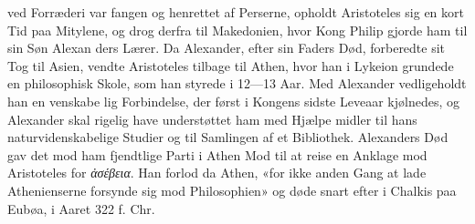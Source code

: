\documentclass[12pt,a4paper]{book}
\newcommand{\gk}[1]{\textit{#1}}
\begin{document}
ved Forræderi var fangen og henrettet af Perserne, opholdt
Aristoteles sig en kort Tid paa Mitylene, og drog derfra til
Makedonien, hvor Kong Philip gjorde ham til sin Søn Alexan\-%
ders Lærer. Da Alexander, efter sin Faders Død, forberedte
sit Tog til Asien, vendte Aristoteles tilbage til Athen, hvor
han i Lykeion grundede en philosophisk Skole, som han styrede
i 12---13 Aar. Med Alexander vedligeholdt han en venskabe\-%
lig Forbindelse, der først i Kongens sidste Leveaar kjølnedes,
og Alexander skal rigelig have understøttet ham med Hjælpe\-%
midler til hans naturvidenskabelige Studier og til Samlingen
af et Bibliothek. Alexanders Død gav det mod ham fjendtlige
Parti i Athen Mod til at reise en Anklage mod Aristoteles for
\gk{ἀσέβεια}. Han forlod da Athen, «for ikke anden Gang at lade
Athenienserne forsynde sig mod Philosophien» og døde snart
efter i Chalkis paa Eubøa, i Aaret 322 f. Chr.
\end{document}
